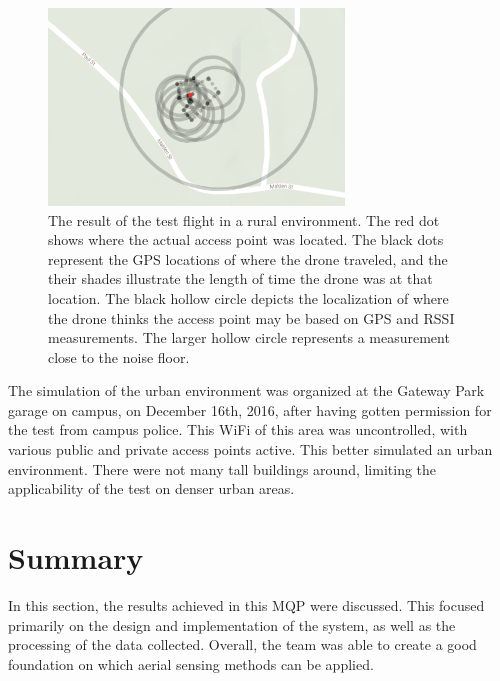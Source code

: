 \begin{figure}[ht!]
	\centering
	\includegraphics[width=0.70\textwidth]{img/ruraltest.png}
	\caption{The result of the test flight in a rural environment. The red dot shows where the actual access point was located. The black dots represent the GPS locations of where the drone traveled, and the their shades illustrate the length of time the drone was at that location. The black hollow circle depicts the localization of where the drone thinks the access point may be based on GPS and RSSI measurements. The larger hollow circle represents a measurement close to the noise floor.}
	\label{fig:rural_test}
\end{figure} \par
The simulation of the urban environment was organized at the Gateway Park garage on campus, on December 16th, 2016, after having gotten permission for the test from campus police. This WiFi of this area was uncontrolled, with various public and private access points active. This better simulated an urban environment. There were not many tall buildings around, limiting the applicability of the test on denser urban areas. 


\section{Summary}
In this section, the results achieved in this MQP were discussed. This focused primarily on the design and implementation of the system, as well as the processing of the data collected. Overall, the team was able to create a good foundation on which aerial sensing methods can be applied.

